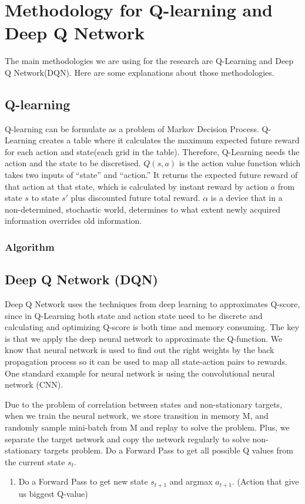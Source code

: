 \chapter{Methodology for Q-learning and Deep Q Network}
\label{Ch:methodology}

The main methodologies we are using for the research are Q-Learning and Deep Q Network(DQN). Here are some explanations about those methodologies.

\section{Q-learning}
Q-learning can be formulate as a problem of Markov Decision Process. Q-Learning creates a table where it calculates the maximum expected future reward for each action and state(each grid in the table). Therefore, Q-Learning needs the action and the state to be discretised. $Q(s,a)$ is the action value function which takes two inputs of “state” and “action.” It returns the expected future reward of that action at that state, which is calculated by instant reward by action $a$ from state $s$ to state $s'$ plus discounted future total reward. $\alpha$ is a device that in a non-determined, stochastic world, determines to what extent newly acquired information overrides old information.

\subsection{Algorithm}

\section{Deep Q Network (DQN)}
Deep Q Network uses the techniques from deep learning to approximates Q-score, since in Q-Learning both state and action state need to be discrete and calculating and optimizing Q-score is both time and memory consuming. The key is that we apply the deep neural network to approximate the Q-function. We know that neural network is used to find out the right weights by the back propagation process so it can be used to map all state-action pairs to rewards. One standard example for neural network is using the convolutional neural network (CNN). 

Due to the problem of correlation between states and non-stationary targets, when we train the neural network, we store transition in memory M, and randomly sample mini-batch from M and replay to solve the problem. Plus, we separate the target network and copy the network regularly to solve non-stationary targets problem. Do a Forward Pass to get all possible Q values from the current state $s_t$.
\begin{enumerate}{}
\item Do a Forward Pass to get new state $s_{t+1}$ and argmax $a_{t+1}$. (Action that give us biggest Q-value)

\end{enumerate}

